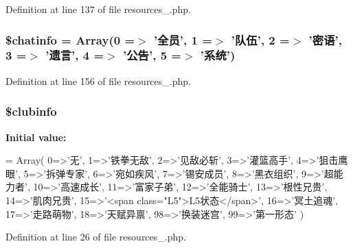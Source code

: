 Definition at line 137 of file resources\+\_.\+php.

\hypertarget{resources__1_8php_abcea2ccdba90758edbd052712f3b2cec}{
\subsubsection[{\$chatinfo}]{\setlength{\rightskip}{0pt plus 5cm}\$chatinfo = Array(0 =$>$ '全员', 1 =$>$ '队伍', 2 =$>$ '密语', 3 =$>$ '遗言', 4 =$>$ '公告', 5 =$>$ '系统')}}\label{resources__1_8php_abcea2ccdba90758edbd052712f3b2cec}


Definition at line 156 of file resources\+\_.\+php.

\hypertarget{resources__1_8php_a8b3df41376c3d0f32c94cad94b494ce0}{
\subsubsection[{\$clubinfo}]{\setlength{\rightskip}{0pt plus 5cm}\$clubinfo}}\label{resources__1_8php_a8b3df41376c3d0f32c94cad94b494ce0}
{\bfseries Initial value\+:}
\begin{DoxyCode}
= Array(
    0=>\textcolor{stringliteral}{'无'},
    1=>\textcolor{stringliteral}{'铁拳无敌'},
    2=>\textcolor{stringliteral}{'见敌必斩'},
    3=>\textcolor{stringliteral}{'灌篮高手'},
    4=>\textcolor{stringliteral}{'狙击鹰眼'},
    5=>\textcolor{stringliteral}{'拆弹专家'},
    6=>\textcolor{stringliteral}{'宛如疾风'},
    7=>\textcolor{stringliteral}{'锡安成员'},
    8=>\textcolor{stringliteral}{'黑衣组织'},
    9=>\textcolor{stringliteral}{'超能力者'},
    10=>\textcolor{stringliteral}{'高速成长'},
    11=>\textcolor{stringliteral}{'富家子弟'},
    12=>\textcolor{stringliteral}{'全能骑士'},
    13=>\textcolor{stringliteral}{'根性兄贵'},
    14=>\textcolor{stringliteral}{'肌肉兄贵'},
    15=>\textcolor{stringliteral}{'<span class="L5">L5状态</span>'},
    16=>\textcolor{stringliteral}{'冥土追魂'},
    17=>\textcolor{stringliteral}{'走路萌物'},
    18=>\textcolor{stringliteral}{'天赋异禀'},
    98=>\textcolor{stringliteral}{'换装迷宫'},
    99=>\textcolor{stringliteral}{'第一形态'}
    )
\end{DoxyCode}


Definition at line 26 of file resources\+\_.\+php.

